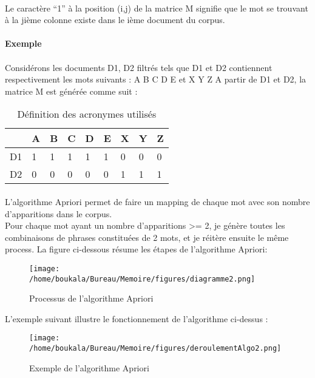 \documentclass[12pt, a4paper, oneside]{book}
\begin{document}
\paragraph{}
Le caractère “1” à la position (i,j) de la matrice M signifie que le mot se trouvant à la jième colonne existe dans le ième document du corpus.
\paragraph{}
\textbf{Exemple}\\ \\
Considérons les documents D1, D2  filtrés tels que D1 et D2 contiennent respectivement les mots suivants : 
A B C D E et X Y Z 
A partir de D1 et D2, la matrice M est générée comme suit :


\begin{table}[h!]
\centering
\begin{tabular}{| l | l | l | l | l | l | l | l | l |}
 \hline
 & A & B & C & D & E & X & Y & Z \\
 \hline
 D1 & 1 & 1 & 1 & 1 & 1 & 0 & 0 & 0 \\
 \hline
 D2 & 0 & 0 & 0 & 0 & 0 & 1 & 1 & 1 \\
 \hline
 
\end{tabular}
\caption{Définition des acronymes utilisés}
\end{table}
 
\paragraph{}
L'algorithme Apriori permet de faire un mapping de chaque mot avec son nombre d'apparitions dans le corpus.\\
Pour chaque mot ayant un nombre d'apparitions >= 2, je génère toutes les combinaisons de phrases constituées de 2 mots, et je réitère ensuite le même process. La figure ci-dessous résume les étapes de l'algorithme Apriori:


\begin{figure}[h!]
\begin{center}
\texttt{[image: /home/boukala/Bureau/Memoire/figures/diagramme2.png]}
\caption{Processus de l'algorithme Apriori}
\end{center}
\end{figure}

L'exemple suivant illustre le fonctionnement de l'algorithme ci-dessus : 

\begin{figure}[h!]
\begin{center}
\texttt{[image: /home/boukala/Bureau/Memoire/figures/deroulementAlgo2.png]}
\caption{Exemple de l'algorithme Apriori}
\end{center}
\end{figure}
\end{document}
